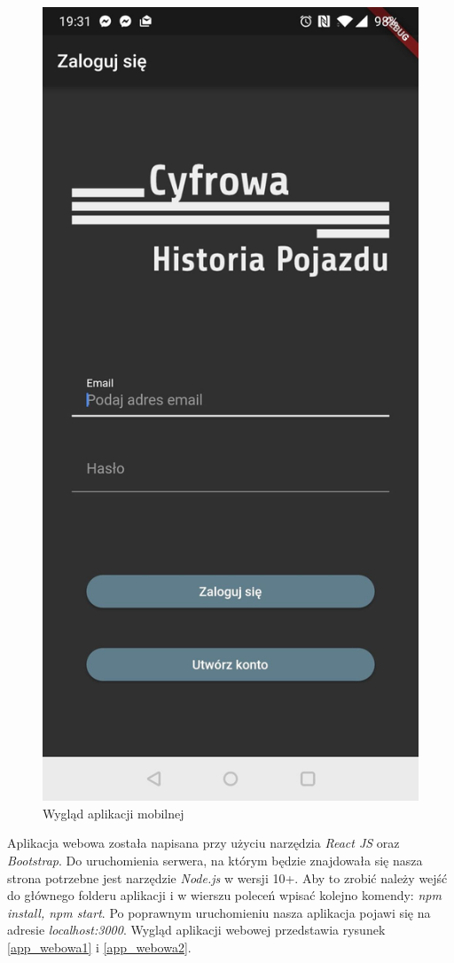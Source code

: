 \documentclass[12pt]{article}
\begin{document}
\begin{figure}[H]
		\includegraphics[scale=0.20]{app_mobilna2.png}
		\caption{Wygląd aplikacji mobilnej}
		\label{app_mobilna}
	\end{figure}

Aplikacja webowa została napisana przy użyciu narzędzia \textit{React JS} oraz \textit{Bootstrap}.
Do uruchomienia serwera, na którym będzie znajdowała się nasza strona potrzebne jest narzędzie \textit{Node.js} w wersji 10+. Aby to zrobić należy wejść do głównego folderu aplikacji i w wierszu poleceń wpisać kolejno komendy: \textit{npm install, npm start}. Po poprawnym uruchomieniu nasza aplikacja pojawi się na adresie \textit{localhost:3000}. Wygląd aplikacji webowej przedstawia rysunek  \ref{app_webowa1} i \ref{app_webowa2}.
\end{document}

